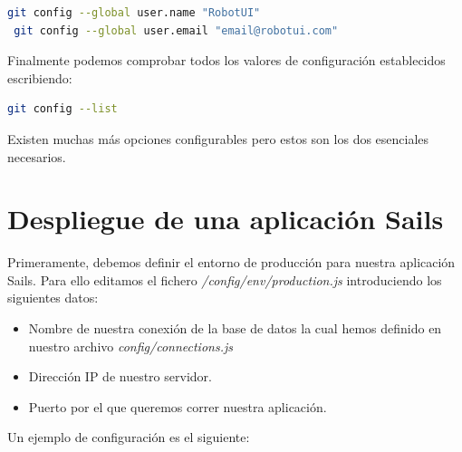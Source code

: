 \begin{lstlisting}[language=bash]
 git config --global user.name "RobotUI"
 git config --global user.email "email@robotui.com"
\end{lstlisting}

Finalmente podemos comprobar todos los valores de configuración establecidos escribiendo:\\

\begin{lstlisting}[language=bash]
git config --list
\end{lstlisting}

Existen muchas más opciones configurables pero estos son los dos esenciales necesarios.\\

\section{Despliegue de una aplicación Sails}

Primeramente, debemos definir el entorno de producción para nuestra aplicación Sails. Para ello editamos el fichero \emph{/config/env/production.js} introduciendo los siguientes datos:\\

\begin{itemize}
 \item Nombre de nuestra conexión de la base de datos la cual hemos definido en nuestro archivo \emph{config/connections.js}
 \item Dirección IP de nuestro servidor.
 \item Puerto por el que queremos correr nuestra aplicación.
\end{itemize}
  
Un ejemplo de configuración es el siguiente:

